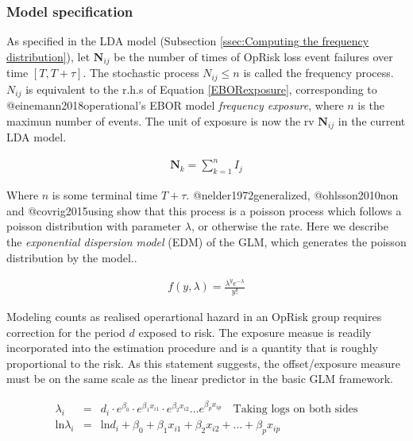 \documentclass[]{article}
\begin{document}
\subsubsection{Model specification}
\label{sssec:Model specification}

As specified in the LDA model (Subsection
\ref{ssec:Computing the frequency distribution}), let
\(\mathbf{N}_{ij}\) be the number of times of OpRisk loss event failures
over time \([T,T+\tau]\). The stochastic process \(N_{ij}\leq n\) is
called the frequency process. \(N_{ij}\) is equivalent to the r.h.s of
Equation \ref{EBORexposure}, corresponding to @einemann2018operational's
EBOR model \emph{frequency exposure}, where \(n\) is the maximun number
of events. The unit of exposure is now the rv \(\mathbf{N}_{ij}\) in the
current LDA model.

\singlespacing

\begin{eqnarray}
\mathbf{N}_k = \sum_{k=1}^n I_j 
\end{eqnarray} \doublespacing

Where \(n\) is some terminal time \(T+\tau\). @nelder1972generalized,
@ohlsson2010non and @covrig2015using show that this process is a poisson
process which follows a poisson distribution with parameter \(\lambda\),
or otherwise the rate. Here we describe the \emph{exponential dispersion
model} (EDM) of the GLM, which generates the poisson distribution by the
model..

\singlespacing

\begin{eqnarray}\label{EDMpoisson}
f(y,\lambda) = \frac{\lambda^ye^{-\lambda}}{y!}
\end{eqnarray} \doublespacing

Modeling counts as realised operartional hazard in an OpRisk group
requires correction for the period \(d\) exposed to risk. The exposure
measue is readily incorporated into the estimation procedure and is a
quantity that is roughly proportional to the risk. As this statement
suggests, the offset/exposure measure must be on the same scale as the
linear predictor in the basic GLM framework.

\singlespacing

\begin{eqnarray}\label{EQlnOffset}
\lambda_i &=& d_i\cdot e^{\beta_0}\cdot e^{\beta_1x_{i1}}\cdot e^{\beta_2x_{i2}} \ldots e^{\beta_px_{ip}}\quad \mbox{Taking logs on both sides}\nonumber\\
\mbox{ln}\lambda_i &=&  \mbox{ln}d_i + \beta_0 + \beta_1x_{i1} + \beta_2x_{i2} + \ldots + \beta_px_{ip}
\end{eqnarray} \doublespacing
\end{document}
